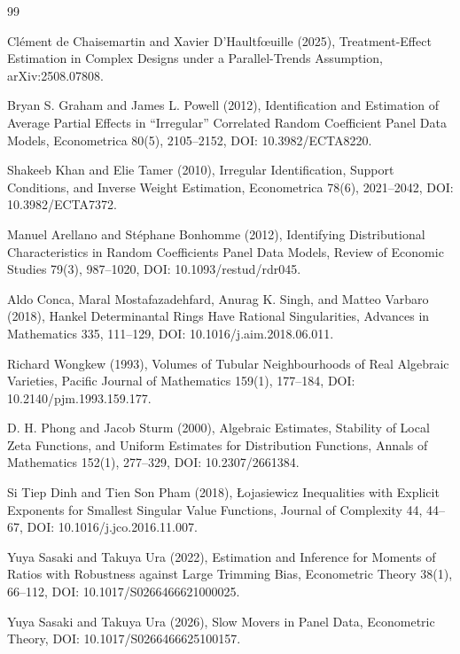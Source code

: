 \documentclass{article}
\begin{document}
\begin{thebibliography}{99}

   Clément de Chaisemartin and Xavier D'Haultfœuille (2025), Treatment-Effect Estimation in Complex Designs under a Parallel-Trends Assumption, arXiv:2508.07808.

   Bryan S. Graham and James L. Powell (2012), Identification and Estimation of Average Partial Effects in ``Irregular'' Correlated Random Coefficient Panel Data Models, Econometrica 80(5), 2105--2152, DOI: 10.3982/ECTA8220.

   Shakeeb Khan and Elie Tamer (2010), Irregular Identification, Support Conditions, and Inverse Weight Estimation, Econometrica 78(6), 2021--2042, DOI: 10.3982/ECTA7372.

   Manuel Arellano and Stéphane Bonhomme (2012), Identifying Distributional Characteristics in Random Coefficients Panel Data Models, Review of Economic Studies 79(3), 987--1020, DOI: 10.1093/restud/rdr045.

   Aldo Conca, Maral Mostafazadehfard, Anurag K. Singh, and Matteo Varbaro (2018), Hankel Determinantal Rings Have Rational Singularities, Advances in Mathematics 335, 111--129, DOI: 10.1016/j.aim.2018.06.011.

   Richard Wongkew (1993), Volumes of Tubular Neighbourhoods of Real Algebraic Varieties, Pacific Journal of Mathematics 159(1), 177--184, DOI: 10.2140/pjm.1993.159.177.

   D. H. Phong and Jacob Sturm (2000), Algebraic Estimates, Stability of Local Zeta Functions, and Uniform Estimates for Distribution Functions, Annals of Mathematics 152(1), 277--329, DOI: 10.2307/2661384.

   Si Tiep Dinh and Tien Son Pham (2018), Łojasiewicz Inequalities with Explicit Exponents for Smallest Singular Value Functions, Journal of Complexity 44, 44--67, DOI: 10.1016/j.jco.2016.11.007.

   Yuya Sasaki and Takuya Ura (2022), Estimation and Inference for Moments of Ratios with Robustness against Large Trimming Bias, Econometric Theory 38(1), 66--112, DOI: 10.1017/S0266466621000025.

   Yuya Sasaki and Takuya Ura (2026), Slow Movers in Panel Data, Econometric Theory, DOI: 10.1017/S0266466625100157.


\end{thebibliography}
\end{document}
